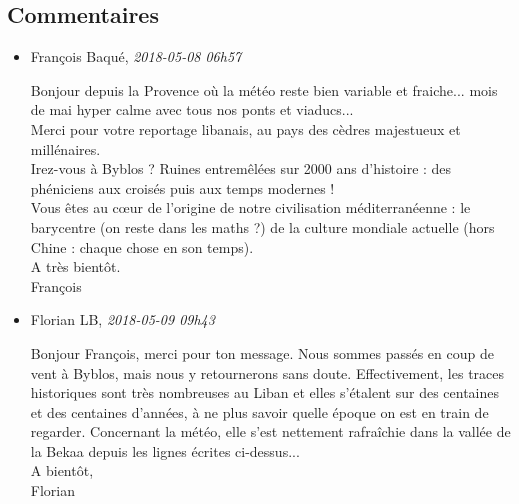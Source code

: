 \hypertarget{commentaires}{%
\subsection{Commentaires}\label{commentaires}}

\begin{itemize}
\item
  François Baqué, \emph{2018-05-08 06h57}

  Bonjour depuis la Provence où la météo reste bien variable et
  fraiche... mois de mai hyper calme avec tous nos ponts et viaducs...\\
  Merci pour votre reportage libanais, au pays des cèdres majestueux et
  millénaires.\\
  Irez-vous à Byblos ? Ruines entremêlées sur 2000 ans d'histoire : des
  phéniciens aux croisés puis aux temps modernes !\\
  Vous êtes au cœur de l'origine de notre civilisation méditerranéenne :
  le barycentre (on reste dans les maths ?) de la culture mondiale
  actuelle (hors Chine : chaque chose en son temps).\\
  A très bientôt.\\
  François
\item
  Florian LB, \emph{2018-05-09 09h43}

  Bonjour François, merci pour ton message. Nous sommes passés en coup
  de vent à Byblos, mais nous y retournerons sans doute. Effectivement,
  les traces historiques sont très nombreuses au Liban et elles
  s'étalent sur des centaines et des centaines d'années, à ne plus
  savoir quelle époque on est en train de regarder. Concernant la météo,
  elle s'est nettement rafraîchie dans la vallée de la Bekaa depuis les
  lignes écrites ci-dessus...\\
  A bientôt,\\
  Florian
\end{itemize}
